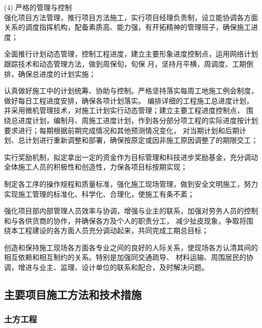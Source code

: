 (4) 严格的管理与控制\\

 强化项目方法管理，推行项目方法施工，实行项目经理负责制，设立能协调各方面关系的调度指挥机构，配备素质高、能力强，有开拓精神的管理班子，确保施工进度；

 全面推行计划动态管理，控制工程进度，建立主要形象进度控制点，运用网络计划跟踪技术和动态管理方法，做到周保旬，旬保
月，坚持月平横，周调度、工期倒排，确保总进度的计划实施；

 认真做好施工中的计划统筹、协助与控制。严格坚持落实每周工地施工例会制度，做好每日工程进度安排，确保各项计划落实。
编排详细的工程施工总进度计划，并采用微机管理技术，对施工计划实行动态管理；建立主要工程进度控制点，
围绕总进度计划，编制月、周施工进度计划，作到各分部分项工程的实际进度按计划要求进行；每期根据前期完成情况和其他预测情况变化，
对当期计划和后期计划、总计划进行重新调整和部署，确保按原定或因非施工原因调整了的期限交工；

 实行奖励机制，拟定拿出一定的资金作为目标管理和科技进步奖励基金，充分调动全体施工人员的积极性和创造性，力保各项目标按期实现；

 制定各工序的操作规程和质量标准，强化施工现场管理，做到安全文明施工，努力实现施工管理的标准化、科学化、合理化，使施工有条不紊；

 强化项目部内部管理人员效率与协调，增强与业主的联系，加强对劳务人员的控制和与各供货商的协作，并确保各方及个人的职责分工，
减少扯皮现象，争取将围绕本工程建设的各方面人员充分调动起来，共同完成工期总目标；

 创造和保持施工现场各方面各专业之间的良好的人际关系，使现场各方认清其间的相互依赖和相互制约的关系。特别是加强同交通疏导、
材料运输、周围居民的协调，增进与业主、监理、设计单位的联系和配合，及时解决问题。

\subsection{主要项目施工方法和技术措施}
\subsubsection{土方工程}

